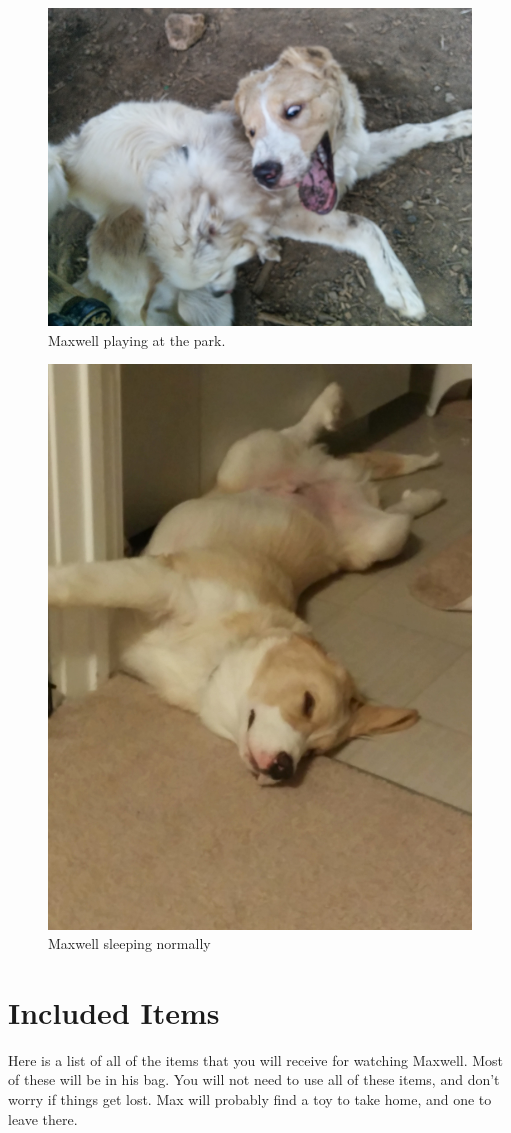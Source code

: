 \documentclass[pdftex,12pt]{article}
\begin{document}
\clearpage

\vspace*{\fill}

\begin{figure}[h!]
    \centering
    \includegraphics[width=.35\textwidth]{./images/max/at_the_park.jpg}
    \caption*{Maxwell playing at the park.}
    \label{fig:at_the_park}
\end{figure}

\bigskip

\begin{figure}[h!]\label{fig:sleeping}
    \centering
    \includegraphics[width=.35\textwidth]{./images/max/sleeping.jpg}
    \caption*{Maxwell sleeping normally}
\end{figure}

\vspace*{\fill}

\clearpage
\newpage
\section{Included Items}

Here is a list of all of the items that you will receive for watching Maxwell.
Most of these will be in his bag.
You will not need to use all of these items, and don't worry if things get lost.
Max will probably find a toy to take home, and one to leave there.
\end{document}
